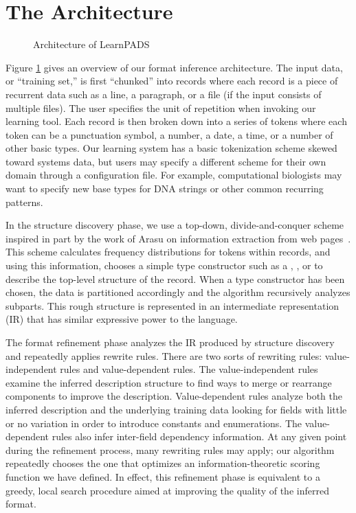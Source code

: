 \documentclass{sig-alternate-sigmod08}
\begin{document}
\section{The Architecture}
\begin{figure}
\begin{center}
\caption{Architecture of LearnPADS}
\vspace*{-5mm}
\label{fig-archi}
\end{center}
\end{figure}
Figure \ref{fig-archi} gives an overview of our format inference
architecture. The input data, or ``training set,'' 
is first ``chunked'' into records where
each record is a piece of recurrent data such as a line, 
a paragraph, or a file (if the input consists of multiple files).
The user specifies the unit of repetition when invoking our 
learning tool.
Each record is then broken down into a series of tokens where each
token can be a punctuation symbol, a number, a date, a time, or a number of other
basic types.  Our learning system has a basic tokenization scheme
skewed toward systems data, but users may specify a different scheme 
for their own domain through a configuration file.  For example,
computational biologists may want to specify new base types for DNA strings
or other common recurring patterns.

In the structure discovery phase, we use a top-down, divide-and-conquer
scheme inspired in part by the work of Arasu on
information extraction from web pages~\cite{arasu+:sigmod03}. 
This scheme calculates
frequency distributions for tokens within records, and using this information,
chooses a simple type constructor such as a , , or
 to describe the top-level structure of the record. 
When a type constructor has been chosen, the data is partitioned accordingly
and the algorithm recursively analyzes subparts.  This
rough structure is represented in an intermediate representation (IR)
that has similar expressive power to the \pads{} language. 

The format refinement phase analyzes the IR produced by structure discovery
and repeatedly applies 
rewrite rules.  There are two sorts of rewriting rules: 
value-independent rules and value-dependent rules.
The value-independent rules examine the inferred description structure
to find ways to merge or rearrange components to improve the description.
Value-dependent rules analyze both the inferred description and the underlying
training data looking for fields with little or no 
variation in order to introduce constants and enumerations.
The value-dependent rules also infer
inter-field dependency information.
At any given point during the refinement process,
many rewriting rules may apply; our algorithm repeatedly chooses the one 
that optimizes an information-theoretic
scoring function we have defined.
In effect, this refinement phase is equivalent to a greedy, local search
procedure aimed at improving the quality of the inferred format.
\end{document}
